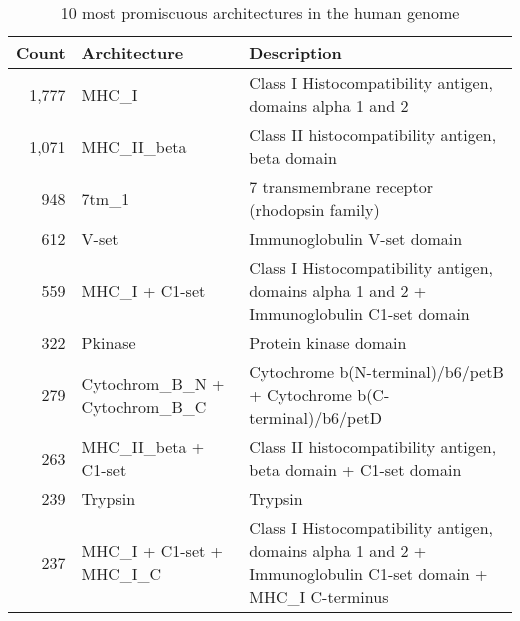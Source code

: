\begin{table}
	\begin{center}
		\sf
		\begin{tabular}{r p{} p{}}
			\textbf{Count} & \textbf{Architecture} & \textbf{Description} \\
			\hline
			1,777  & MHC\_I          & Class I Histocompatibility antigen, domains alpha 1 and 2 \\ 
			1,071  & MHC\_II\_beta    & Class II histocompatibility antigen, beta domain          \\ 
			948   & 7tm\_1          & 7 transmembrane receptor (rhodopsin family)               \\ 
			612   & V-set          & Immunoglobulin V-set domain                               \\ 
			559   & MHC\_I + C1-set &         Class I Histocompatibility antigen, domains alpha 1 and 2 + \newline Immunoglobulin C1-set domain                                                     \\ 
			322   & Pkinase        & Protein kinase domain                                     \\ 
			279   & Cytochrom\_B\_N  + \newline Cytochrom\_B\_C & Cytochrome b(N-terminal)/b6/petB + \newline Cytochrome b(C-terminal)/b6/petD                                                    \\ 
			263   & MHC\_II\_beta + C1-set & Class II histocompatibility antigen, beta domain + \newline C1-set domain                                                    \\ 
			239   & Trypsin        &  Trypsin                                                   \\ 
			237   & MHC\_I + C1-set + \newline MHC\_I\_C & Class I Histocompatibility antigen, domains alpha 1 and 2 + \newline Immunoglobulin C1-set domain + \newline MHC\_I C-terminus                                                    \\ 
			\hline
		\end{tabular}
		\caption{10 most promiscuous architectures in the human genome}
	\end{center}
\end{table}


